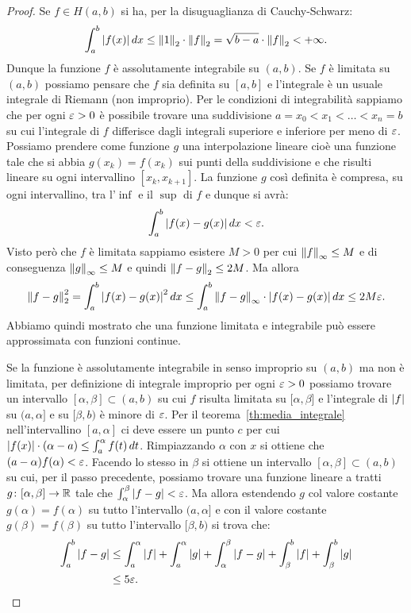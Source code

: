 \begin{proof}
Se $f\in H(a,b)$ si ha,
per la disuguaglianza di Cauchy-Schwarz:
\[
  \int_a^b {\left|f(x)\right|}\, dx
  \le {\left\Vert 1\right\Vert}_2 \cdot {\left\Vert f\right\Vert}_2 = \sqrt{b-a}\cdot {\left\Vert f\right\Vert}_2 < +\infty.
\]
Dunque la funzione $f$ è assolutamente integrabile su $(a,b)$.
Se $f$ è limitata su $(a,b)$ possiamo pensare che $f$ sia definita su $[a,b]$
e l'integrale è un usuale integrale di Riemann (non improprio).
Per le condizioni di integrabilità sappiamo che per ogni $\varepsilon>0$ è possibile
trovare una suddivisione $a=x_0 < x_1 < \dots < x_n =b$ su cui l'integrale
di $f$ differisce dagli integrali superiore e inferiore per meno di $\varepsilon$.
Possiamo prendere come funzione $g$ una interpolazione lineare
cioè una funzione tale che si abbia $g(x_k) = f(x_k)$ sui punti della suddivisione
e che risulti lineare su ogni intervallino $[x_k,x_{k+1}]$. La funzione
$g$ così definita è compresa, su ogni intervallino, tra l'$\inf$ e il $\sup$
di $f$ e dunque si avrà:
\[
 \int_a^b {\left|f(x)-g(x)\right|}\, dx < \varepsilon.
\]
Visto però che $f$ è limitata sappiamo esistere $M>0$ per cui ${\left\Vert f\right\Vert}_\infty\le M$
e di conseguenza ${\left\Vert g\right\Vert}_\infty\le M$ e quindi ${\left\Vert f-g\right\Vert}_2\le 2M$.
Ma allora
\[
  {\left\Vert f-g\right\Vert}_2^2 = \int_a^b {\left|f(x)-g(x)\right|}^2\, dx
  \le \int_a^b {\left\Vert f-g\right\Vert}_\infty \cdot {\left|f(x)-g(x)\right|}\, dx
  \le 2M \varepsilon.
\]
Abbiamo quindi mostrato che una funzione limitata e integrabile può essere
approssimata con funzioni continue.

Se la funzione è assolutamente 
integrabile in senso improprio su $(a,b)$ ma non è limitata, per
definizione di integrale improprio per ogni $\varepsilon>0$ possiamo trovare un intervallo
$[\alpha,\beta]\subset (a,b)$
su cui $f$ risulta limitata su $[\alpha,\beta$] e
l'integrale di ${\left|f\right|}$ su $(a,\alpha]$ e su $[\beta,b)$
è minore di $\varepsilon$.
Per il teorema~\ref{th:media_integrale}
nell'intervallino $[a,\alpha]$ ci deve essere un punto $c$ per cui 
${\left|f(x)\right|} \cdot (\alpha-a) \le \int_a^\alpha f(t)\, dt$.
Rimpiazzando $\alpha$ con $x$ si ottiene che $(a-\alpha)f(\alpha) < \varepsilon$.
Facendo lo stesso in $\beta$ si ottiene un intervallo $[\alpha,\beta]\subset (a,b)$ 
su cui, per il passo precedente, 
possiamo trovare una funzione lineare a tratti $g\colon[\alpha,\beta]\to {\mathbb R}$ 
tale che $\int_\alpha^\beta {\left|f-g\right|} < \varepsilon$.
Ma allora estendendo $g$ col valore costante $g(\alpha)=f(\alpha)$ 
su tutto l'intervallo $(a,\alpha]$ e con il valore costante $g(\beta)=f(\beta)$ 
su tutto l'intervallo $[\beta,b)$ si trova che:
\begin{align*}
\int_a^b {\left|f-g\right|} 
&\le \int_a^\alpha {\left|f\right|} + \int_a^\alpha {\left|g\right|} 
+ \int_\alpha^\beta {\left|f-g\right|} + \int_\beta^b {\left|f\right|} 
+ \int_\beta^b {\left|g\right|} \\
&\le 5 \varepsilon.
\end{align*}
\end{proof}

